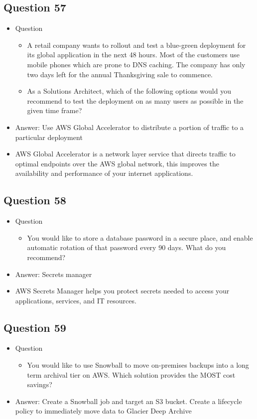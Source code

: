 \documentclass[]{scrartcl}
\begin{document}
\subsection{Question 57}
\begin{itemize}
	\item Question
	\begin{itemize}
		\item A retail company wants to rollout and test a blue-green deployment for its global application in the next 48 hours. Most of the customers use mobile phones which are prone to DNS caching. The company has only two days left for the annual Thanksgiving sale to commence.
		\item As a Solutions Architect, which of the following options would you recommend to test the deployment on as many users as possible in the given time frame?
	\end{itemize}
	\item Answer: Use AWS Global Accelerator to distribute a portion of traffic to a particular deployment
	\item AWS Global Accelerator is a network layer service that directs traffic to optimal endpoints over the AWS global network, this improves the availability and performance of your internet applications. 
\end{itemize}

\subsection{Question 58}
\begin{itemize}
	\item Question
	\begin{itemize}
		\item You would like to store a database password in a secure place, and enable automatic rotation of that password every 90 days. What do you recommend?
	\end{itemize}
	\item Answer: Secrets manager
	\item AWS Secrets Manager helps you protect secrets needed to access your applications, services, and IT resources. 
\end{itemize}

\subsection{Question 59}
\begin{itemize}
	\item Question
	\begin{itemize}
		\item You would like to use Snowball to move on-premises backups into a long term archival tier on AWS. Which solution provides the MOST cost savings?
	\end{itemize}
	\item Answer: Create a Snowball job and target an S3 bucket. Create a lifecycle policy to immediately move data to Glacier Deep Archive
\end{itemize}
\end{document}
